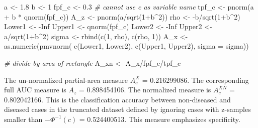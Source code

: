 \documentclass[
]{book}
\newenvironment{Shaded}{\begin{snugshade}}{\end{snugshade}}
\newcommand{\AttributeTok}[1]{\textcolor[rgb]{0.77,0.63,0.00}{#1}}
\newcommand{\CommentTok}[1]{\textcolor[rgb]{0.56,0.35,0.01}{\textit{#1}}}
\newcommand{\ConstantTok}[1]{\textcolor[rgb]{0.00,0.00,0.00}{#1}}
\newcommand{\DecValTok}[1]{\textcolor[rgb]{0.00,0.00,0.81}{#1}}
\newcommand{\FloatTok}[1]{\textcolor[rgb]{0.00,0.00,0.81}{#1}}
\newcommand{\FunctionTok}[1]{\textcolor[rgb]{0.00,0.00,0.00}{#1}}
\newcommand{\NormalTok}[1]{#1}
\newcommand{\OtherTok}[1]{\textcolor[rgb]{0.56,0.35,0.01}{#1}}
\newcommand{\SpecialCharTok}[1]{\textcolor[rgb]{0.00,0.00,0.00}{#1}}
\begin{document}
\begin{Shaded}
\begin{Highlighting}[numbers=left,,]
\NormalTok{a }\OtherTok{\textless{}{-}} \FloatTok{1.8}
\NormalTok{b }\OtherTok{\textless{}{-}} \DecValTok{1}
\NormalTok{fpf\_c }\OtherTok{\textless{}{-}} \FloatTok{0.3} \CommentTok{\# cannot use c as variable name}
\NormalTok{tpf\_c }\OtherTok{\textless{}{-}} \FunctionTok{pnorm}\NormalTok{(a }\SpecialCharTok{+}\NormalTok{ b }\SpecialCharTok{*} \FunctionTok{qnorm}\NormalTok{(fpf\_c))}
\NormalTok{A\_z }\OtherTok{\textless{}{-}} \FunctionTok{pnorm}\NormalTok{(a}\SpecialCharTok{/}\FunctionTok{sqrt}\NormalTok{(}\DecValTok{1}\SpecialCharTok{+}\NormalTok{b}\SpecialCharTok{\^{}}\DecValTok{2}\NormalTok{))}
\NormalTok{rho }\OtherTok{\textless{}{-}} \SpecialCharTok{{-}}\NormalTok{b}\SpecialCharTok{/}\FunctionTok{sqrt}\NormalTok{(}\DecValTok{1}\SpecialCharTok{+}\NormalTok{b}\SpecialCharTok{\^{}}\DecValTok{2}\NormalTok{)}
\NormalTok{Lower1 }\OtherTok{\textless{}{-}} \SpecialCharTok{{-}}\ConstantTok{Inf}
\NormalTok{Upper1 }\OtherTok{\textless{}{-}} \FunctionTok{qnorm}\NormalTok{(fpf\_c)}
\NormalTok{Lower2 }\OtherTok{\textless{}{-}} \SpecialCharTok{{-}}\ConstantTok{Inf}
\NormalTok{Upper2 }\OtherTok{\textless{}{-}}\NormalTok{ a}\SpecialCharTok{/}\FunctionTok{sqrt}\NormalTok{(}\DecValTok{1}\SpecialCharTok{+}\NormalTok{b}\SpecialCharTok{\^{}}\DecValTok{2}\NormalTok{)}
\NormalTok{sigma }\OtherTok{\textless{}{-}} \FunctionTok{rbind}\NormalTok{(}\FunctionTok{c}\NormalTok{(}\DecValTok{1}\NormalTok{, rho), }\FunctionTok{c}\NormalTok{(rho, }\DecValTok{1}\NormalTok{))}
\NormalTok{A\_x }\OtherTok{\textless{}{-}} \FunctionTok{as.numeric}\NormalTok{(}\FunctionTok{pmvnorm}\NormalTok{(}
  \FunctionTok{c}\NormalTok{(Lower1, Lower2), }
  \FunctionTok{c}\NormalTok{(Upper1, Upper2), }
  \AttributeTok{sigma =}\NormalTok{ sigma))}

\CommentTok{\# divide by area of rectangle}
\NormalTok{A\_xn }\OtherTok{\textless{}{-}}\NormalTok{ A\_x}\SpecialCharTok{/}\NormalTok{fpf\_c}\SpecialCharTok{/}\NormalTok{tpf\_c}
\end{Highlighting}
\end{Shaded}

The un-normalized partial-area measure \(A_c^{X}\) = 0.216299086. The corresponding full AUC measure is \(A_z\) = 0.898454106. The normalized measure is \(A_c^{XN}\) = 0.802042166. This is the classification accuracy between non-diseased and diseased cases in the truncated dataset defined by ignoring cases with z-samples smaller than \(-\Phi^{-1}(c)\) = 0.524400513. This measure emphasizes specificity.
\end{document}
